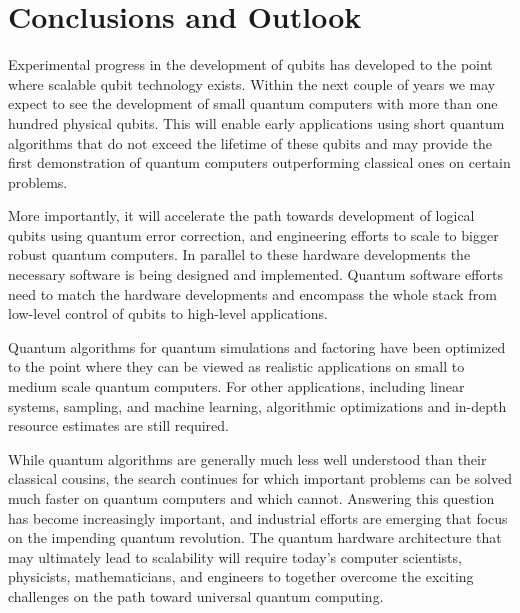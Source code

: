 \documentclass[journal]{IEEEtran}
\begin{document}





\section{Conclusions and Outlook}

Experimental progress in the development of qubits has developed to the point where scalable qubit technology exists. Within the next couple of years we may expect to see the development of small quantum computers with more than one hundred physical qubits. This will enable early applications using short quantum algorithms that do not exceed the lifetime of these qubits and may provide the first demonstration of quantum computers outperforming classical ones on certain problems.

More importantly, it will accelerate the path towards development of logical qubits using quantum error correction, and engineering efforts to scale to bigger robust quantum computers. In parallel to these hardware developments the necessary software is being designed and implemented. Quantum software efforts need to match the hardware developments and encompass the whole stack from low-level control of qubits to high-level applications.

 Quantum algorithms for quantum simulations and factoring have been optimized to the point where they can be viewed as realistic applications on small to medium scale quantum computers. For other applications, including linear systems, sampling, and machine learning, algorithmic optimizations and in-depth resource estimates are still required. 

While quantum algorithms are generally much less well understood than their classical cousins, the search continues for which important problems can be solved much faster on quantum computers and which cannot. Answering this question has become increasingly important, and industrial efforts are emerging that focus on the impending quantum revolution.  The quantum hardware architecture that may ultimately lead to scalability will require today's computer scientists, physicists, mathematicians, and engineers to together overcome the exciting challenges on the path toward universal quantum computing.
\end{document}
